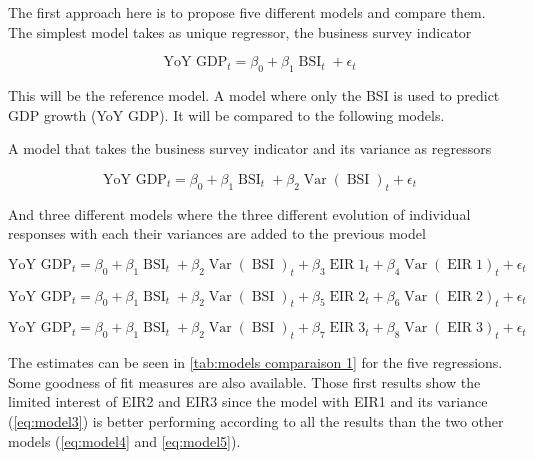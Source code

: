 \documentclass[12pt,a4paper,oneside]{book}
\DeclareMathOperator{\Var}{Var}
\DeclareMathOperator{\BSI}{BSI}
\DeclareMathOperator{\EIR}{EIR}
\begin{document}
The first approach here is to propose five different models and compare them.
The simplest model takes as unique regressor, the business survey indicator

\begin{equation} \tag{Model 1}
    \text{YoY GDP}_{t} = \beta_0 + \beta_{1} \BSI_{t} + \epsilon_t \label{eq:model1}
\end{equation}

This will be the reference model. A model where only the BSI is used to predict GDP growth (YoY GDP). It will be compared to the following models.

A model that takes the business survey indicator and its variance as regressors

\begin{equation} \tag{Model 2}
    \text{YoY GDP}_{t} = \beta_0 + \beta_{1} \BSI_{t} + \beta_{2} \Var(\BSI)_{t} + \epsilon_t \label{eq:model2}
\end{equation}

And three different models where the three different evolution of individual responses with each their variances are added to the previous model

\begin{equation} \tag{Model 3}
    \text{YoY GDP}_{t} = \beta_0 + \beta_{1} \BSI_{t}  + \beta_{2} \Var(\BSI)_{t} + \beta_{3} \EIR1_{t}  + \beta_{4} \Var(\EIR1)_{t} + \epsilon_t \label{eq:model3}
\end{equation}

\begin{equation} \tag{Model 4}
    \text{YoY GDP}_{t} = \beta_0 + \beta_{1} \BSI_{t}  + \beta_{2} \Var(\BSI)_{t} + \beta_{5} \EIR2_{t}  + \beta_{6} \Var(\EIR2)_{t} + \epsilon_t \label{eq:model4}
\end{equation}

\begin{equation} \tag{Model 5}
    \text{YoY GDP}_{t} = \beta_0 + \beta_{1} \BSI_{t}  + \beta_{2} \Var(\BSI)_{t} + \beta_{7} \EIR3_{t}  + \beta_{8} \Var(\EIR3)_{t} + \epsilon_t  \label{eq:model5}
\end{equation}



The estimates can be seen in \autoref{tab:models comparaison 1} for the five regressions. Some goodness of fit measures are also available. 
Those first results show the limited interest of EIR2 and EIR3 since the model with EIR1 and its variance (\ref{eq:model3}) is better performing according to all the results than the two other models (\ref{eq:model4} and \ref{eq:model5}).
\end{document}
